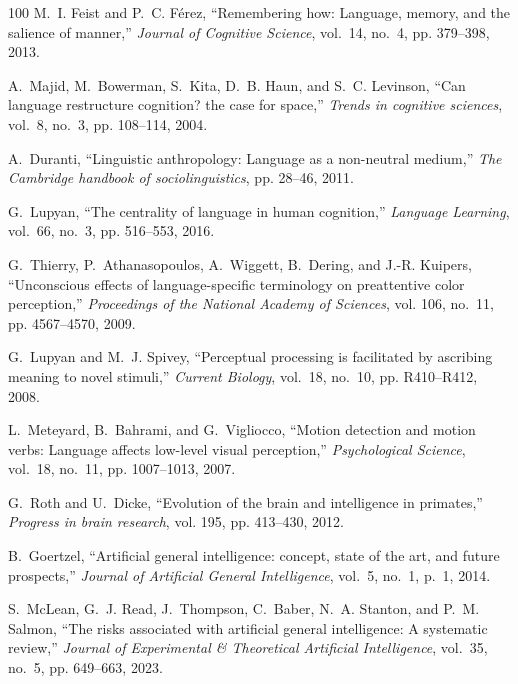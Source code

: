 \documentclass[10pt,journal,compsoc]{IEEEtran}
\begin{document}
\begin{thebibliography}{100}
	M.~I. Feist and P.~C. F{\'e}rez, ``Remembering how: Language, memory, and the
	salience of manner,'' \emph{Journal of Cognitive Science}, vol.~14, no.~4,
	pp. 379--398, 2013.
	
	A.~Majid, M.~Bowerman, S.~Kita, D.~B. Haun, and S.~C. Levinson, ``Can language
	restructure cognition? the case for space,'' \emph{Trends in cognitive
		sciences}, vol.~8, no.~3, pp. 108--114, 2004.
	
	A.~Duranti, ``Linguistic anthropology: Language as a non-neutral medium,''
	\emph{The Cambridge handbook of sociolinguistics}, pp. 28--46, 2011.
	
	G.~Lupyan, ``The centrality of language in human cognition,'' \emph{Language
		Learning}, vol.~66, no.~3, pp. 516--553, 2016.
	
	G.~Thierry, P.~Athanasopoulos, A.~Wiggett, B.~Dering, and J.-R. Kuipers,
	``Unconscious effects of language-specific terminology on preattentive color
	perception,'' \emph{Proceedings of the National Academy of Sciences}, vol.
	106, no.~11, pp. 4567--4570, 2009.
	
	G.~Lupyan and M.~J. Spivey, ``Perceptual processing is facilitated by ascribing
	meaning to novel stimuli,'' \emph{Current Biology}, vol.~18, no.~10, pp.
	R410--R412, 2008.
	
	L.~Meteyard, B.~Bahrami, and G.~Vigliocco, ``Motion detection and motion verbs:
	Language affects low-level visual perception,'' \emph{Psychological Science},
	vol.~18, no.~11, pp. 1007--1013, 2007.
	
	G.~Roth and U.~Dicke, ``Evolution of the brain and intelligence in primates,''
	\emph{Progress in brain research}, vol. 195, pp. 413--430, 2012.
	
	B.~Goertzel, ``Artificial general intelligence: concept, state of the art, and
	future prospects,'' \emph{Journal of Artificial General Intelligence},
	vol.~5, no.~1, p.~1, 2014.
	
	S.~McLean, G.~J. Read, J.~Thompson, C.~Baber, N.~A. Stanton, and P.~M. Salmon,
	``The risks associated with artificial general intelligence: A systematic
	review,'' \emph{Journal of Experimental \& Theoretical Artificial
		Intelligence}, vol.~35, no.~5, pp. 649--663, 2023.
	

\end{thebibliography}
\end{document}
